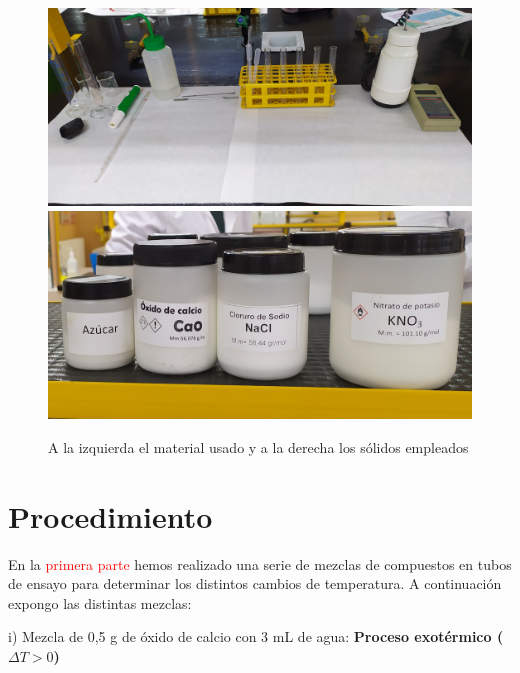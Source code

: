 \begin{figure}[H]
    \centering
    \hspace*{-2.3cm}
        \includegraphics[scale = 0.06]{fotos/mesa2.jpg}
        \includegraphics[scale = 0.08]{fotos/soli2.jpg}
    \hspace*{-2.3cm}
    \caption{A la izquierda el material usado y a la derecha los sólidos empleados}
\end{figure}

\clearpage

\section{Procedimiento} 
\noindent En la \textcolor{red}{primera parte} hemos realizado una serie de mezclas de compuestos en tubos de ensayo para determinar los distintos cambios de temperatura. A continuación expongo las distintas mezclas:

\vspace{0.3cm}

i) Mezcla de 0,5 g de óxido de calcio con 3 mL de agua: \newline
\textbf{Proceso exotérmico ($\Delta{T} > 0$)}

\vspace{0.2cm}

